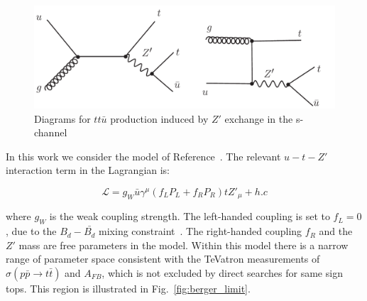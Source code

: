\begin{figure}[htb]
\begin{center}
\includegraphics[width=0.7\linewidth, height=0.25\linewidth]{figs/sstop2.pdf}
\caption{ Diagrams for $tt\bar{u}$ production induced by $Z'$ exchange in the s-channel 
\label{fig:schannel}}
\end{center}
\end{figure}



In this work we consider the model of Reference~\cite{berger}.  
The relevant $u-t-Z'$ interaction term in the Lagrangian is:

\begin{equation}
\label{eqn:L_berger}
  \mathcal{L} = g_W \bar{u} \gamma^\mu (f_L P_L + f_R P_R)tZ'_\mu + h.c
\end{equation}

where $g_W$ is the weak coupling strength. The left-handed coupling is set to $f_L = 0$, due 
to the $B_d-\bar{B_d}$ mixing constraint~\cite{Cao}. 
The right-handed coupling $f_R$ and the $Z'$ mass are free parameters in the model.
Within this model there is a narrow range of parameter space
consistent with the TeVatron measurements of $\sigma(p\bar{p} \to t\bar{t})$ 
and $A_{FB}$, which is not excluded by direct searches for same sign tops.
This region is illustrated in Fig.~\ref{fig:berger_limit}.



